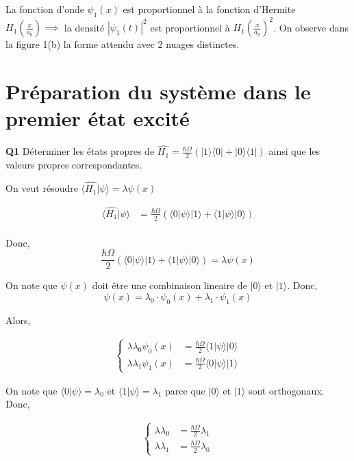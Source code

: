 \documentclass[french]{article}
\begin{document}
	La fonction d'onde $\psi_1(x)$ est proportionnel à la fonction d'Hermite $H_1(\frac{x}{a_0}) \implies $ la densité $|\psi_1(t)|^2$ est proportionnel à $H_1(\frac{x}{a_0})^2$. On observe dans la figure 1(b) la forme attendu avec $2$ nuages distinctes.

	\section{Préparation du système dans le premier état excité}

	\begin{tcolorbox}[colback=gray!5!white,colframe=gray!75!black]
		\textbf{\large{Q1}} Déterminer les états propres de $\hat{H_1} = \frac{\hbar \Omega}{2} \left(|1\rangle \langle 0| + |0\rangle \langle 1| \right)$  ainsi que les valeurs propres correspondantes.
	\end{tcolorbox}

	On veut résoudre $\langle \hat{H_1} | \psi \rangle = \lambda \psi(x)$
	
	\begin{align}
	\langle \hat{H_1} | \psi \rangle &= \frac{\hbar \Omega}{2} \left( \langle 0|\psi \rangle |1\rangle + \langle 1|\psi \rangle |0\rangle\right)\\
	\end{align}
	
	Donc, \[\frac{\hbar \Omega}{2} \left( \langle 0|\psi \rangle |1\rangle + \langle 1|\psi \rangle |0\rangle\right) = \lambda \psi(x)\]
	
	On note que $\psi(x)$ doit être une combinaison lineaire de $|0\rangle$ et $|1\rangle$. Donc, \[\psi(x) = \lambda_0 \cdot \psi_0(x) + \lambda_1 \cdot \psi_1(x)\]
	
	Alors,
	
	\begin{align}
		\begin{cases}
		\lambda \lambda_0 \psi_0(x) &= \frac{\hbar \Omega}{2} \langle 1|\psi \rangle |0\rangle\\
		\lambda \lambda_1 \psi_1(x) &= \frac{\hbar \Omega}{2} \langle 0|\psi \rangle |1\rangle
		\end{cases}
	\end{align}
	
	On note que $ \langle 0|\psi \rangle = \lambda_0$ et $ \langle 1|\psi \rangle = \lambda_1$ parce que $|0\rangle$ et $|1\rangle$ sont orthogonaux. Donc,
	
	\begin{align}
	\begin{cases}
	\lambda \lambda_0 &= \frac{\hbar \Omega}{2} \lambda_1\\
	\lambda \lambda_1 &= \frac{\hbar \Omega}{2} \lambda_0
	\end{cases}
	\end{align}
	
\end{document}
